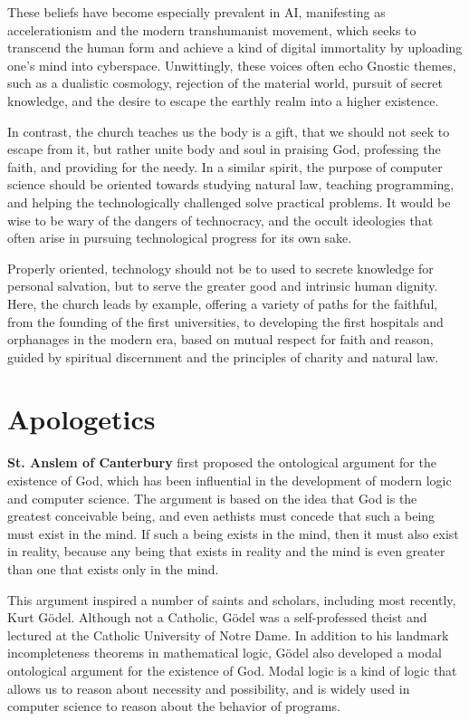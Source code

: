 \documentclass[sigplan,nonacm]{acmart}\settopmatter{printfolios=false,printccs=false,printacmref=false}
\begin{document}
  These beliefs have become especially prevalent in AI, manifesting as accelerationism and the modern transhumanist movement, which seeks to transcend the human form and achieve a kind of digital immortality by uploading one's mind into cyberspace. Unwittingly, these voices often echo Gnostic themes, such as a dualistic cosmology, rejection of the material world, pursuit of secret knowledge, and the desire to escape the earthly realm into a higher existence.

  In contrast, the church teaches us the body is a gift, that we should not seek to escape from it, but rather unite body and soul in praising God, professing the faith, and providing for the needy. In a similar spirit, the purpose of computer science should be oriented towards studying natural law, teaching programming, and helping the technologically challenged solve practical problems. It would be wise to be wary of the dangers of technocracy, and the occult ideologies that often arise in pursuing technological progress for its own sake.

  Properly oriented, technology should not be to used to secrete knowledge for personal salvation, but to serve the greater good and intrinsic human dignity. Here, the church leads by example, offering a variety of paths for the faithful, from the founding of the first universities, to developing the first hospitals and orphanages in the modern era, based on mutual respect for faith and reason, guided by spiritual discernment and the principles of charity and natural law.

  \section{Apologetics}

  \textbf{St. Anslem of Canterbury} first proposed the ontological argument for the existence of God, which has been influential in the development of modern logic and computer science. The argument is based on the idea that God is the greatest conceivable being, and even aethists must concede that such a being must exist in the mind. If such a being exists in the mind, then it must also exist in reality, because any being that exists in reality and the mind is even greater than one that exists only in the mind.

  This argument inspired a number of saints and scholars, including most recently, Kurt G\"odel. Although not a Catholic, G\"odel was a self-professed theist and lectured at the Catholic University of Notre Dame. In addition to his landmark incompleteness theorems in mathematical logic, G\"odel also developed a modal ontological argument for the existence of God. Modal logic is a kind of logic that allows us to reason about necessity and possibility, and is widely used in computer science to reason about the behavior of programs.
\end{document}
